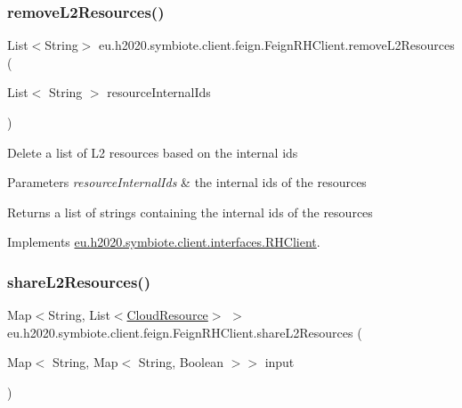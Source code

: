 \subsubsection{\texorpdfstring{remove\+L2\+Resources()}{removeL2Resources()}}
{\footnotesize\ttfamily List$<$String$>$ eu.\+h2020.\+symbiote.\+client.\+feign.\+Feign\+R\+H\+Client.\+remove\+L2\+Resources (\begin{DoxyParamCaption}\item[{List$<$ String $>$}]{resource\+Internal\+Ids }\end{DoxyParamCaption})}

Delete a list of L2 resources based on the internal ids


\begin{DoxyParams}{Parameters}
{\em resource\+Internal\+Ids} & the internal ids of the resources \\
\hline
\end{DoxyParams}
\begin{DoxyReturn}{Returns}
a list of strings containing the internal ids of the resources 
\end{DoxyReturn}


Implements \hyperlink{interfaceeu_1_1h2020_1_1symbiote_1_1client_1_1interfaces_1_1RHClient_a8957be63f35e866513383cd20452a374}{eu.\+h2020.\+symbiote.\+client.\+interfaces.\+R\+H\+Client}.

\mbox{\label{classeu_1_1h2020_1_1symbiote_1_1client_1_1feign_1_1FeignRHClient_a2ad028004364f0068c760134a25956b0}} 
\subsubsection{\texorpdfstring{share\+L2\+Resources()}{shareL2Resources()}}
{\footnotesize\ttfamily Map$<$String, List$<$\hyperlink{classeu_1_1h2020_1_1symbiote_1_1cloud_1_1model_1_1internal_1_1CloudResource}{Cloud\+Resource}$>$ $>$ eu.\+h2020.\+symbiote.\+client.\+feign.\+Feign\+R\+H\+Client.\+share\+L2\+Resources (\begin{DoxyParamCaption}\item[{Map$<$ String, Map$<$ String, Boolean $>$$>$}]{input }\end{DoxyParamCaption})}

